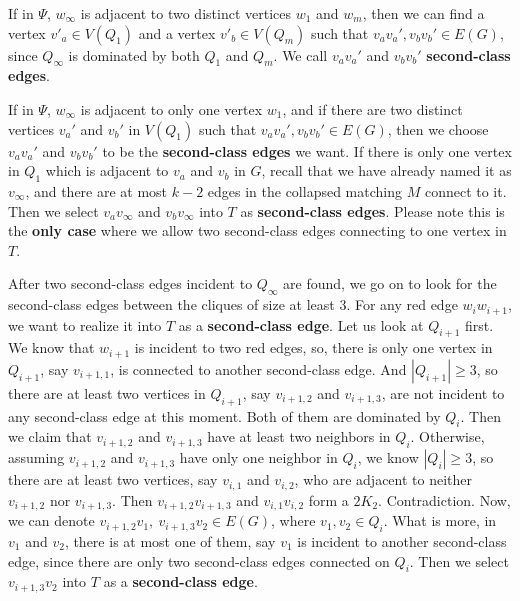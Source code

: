 \documentclass{amsart}
\begin{document}
If in $\Psi$, $w_{\infty}$ is adjacent to two distinct vertices $w_1$ and $w_m$, then we can find a vertex $v'_a\in V(Q_1)$ and a vertex $v'_b\in V(Q_m)$ such that $v_av_a',v_bv_b'\in E(G)$, since $Q_{\infty}$ is dominated by both $Q_1$ and $Q_m$. We call $v_av_a'$ and $v_bv_b'$ {\bf second-class edges}.

If in $\Psi$, $w_{\infty}$ is adjacent to only one vertex $w_1$, and if there are two distinct vertices $v_a'$ and $v_b'$ in $V(Q_1)$ such that $v_av_a',v_bv_b'\in E(G)$, then we choose $v_av_a'$ and $v_bv_b'$ to be the {\bf second-class edges} we want. If there is only one vertex in $Q_1$ which is adjacent to $v_a$ and $v_b$ in $G$, recall that we have already named it as $v_{\infty}$, and there are at most $k-2$ edges in the collapsed matching $M$ connect to it. Then we select $v_av_{\infty}$ and $v_bv_{\infty}$ into $T$ as {\bf second-class edges}. Please note this is the {\bf only case} where we allow two second-class edges connecting to one vertex in $T$.





After two second-class edges incident to $Q_{\infty}$ are found, we go on to look for the second-class edges between the cliques of size at least 3.
For any red edge $w_iw_{i+1}$, we want to realize it into $T$ as a {\bf second-class edge}. Let us look at $Q_{i+1}$ first. We know that $w_{i+1}$ is incident to two red edges, so, there is only one vertex in $Q_{i+1}$, say $v_{i+1,1}$, is connected to another second-class edge. And $|Q_{i+1}|\ge3$, so there are at least two vertices in $Q_{i+1}$, say $v_{i+1,2}$ and $v_{i+1,3}$, are not incident to any second-class edge at this moment. Both of them are dominated by $Q_i$. Then we claim that $v_{i+1,2}$ and $v_{i+1,3}$ have at least two neighbors in $Q_i$. Otherwise, assuming $v_{i+1,2}$ and $v_{i+1,3}$ have only one neighbor in $Q_i$, we know $|Q_i|\ge3$, so there are at least two vertices, say $v_{i,1}$ and $v_{i,2}$, who are adjacent to neither $v_{i+1,2}$ nor $v_{i+1,3}$. Then $v_{i+1,2}v_{i+1,3}$ and $v_{i,1}v_{i,2}$ form a $2K_2$. Contradiction. Now, we can denote $v_{i+1,2}v_1,~v_{i+1,3}v_2\in E(G)$, where $v_1,v_2\in Q_i$. What is more, in $v_1$ and $v_2$, there is at most one of them, say $v_1$ is incident to another second-class edge, since there are only two second-class edges connected on $Q_i$. Then we select $v_{i+1,3}v_2$ into $T$ as a {\bf second-class edge}.
\end{document}
